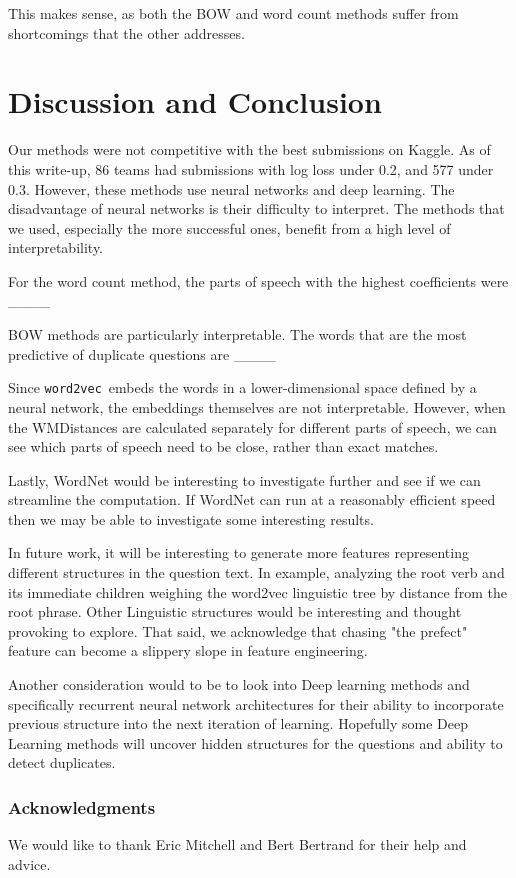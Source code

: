 \documentclass{article} %
\newcommand{\wordtvec}{\texttt{word2vec}}
\begin{document}
This makes sense, as both the BOW and word count methods suffer from shortcomings that the other addresses.

\section{Discussion and Conclusion}

Our methods were not competitive with the best submissions on Kaggle. As of this write-up, 86 teams had submissions with log loss under 0.2, and 577 under 0.3. However, these methods use neural networks and deep learning. The disadvantage of neural networks is their difficulty to interpret. The methods that we used, especially the more successful ones, benefit from a high level of interpretability. 

For the word count method, the parts of speech with the highest coefficients were \_\_\_\_

BOW methods are particularly interpretable. The words that are the most predictive of duplicate questions are \_\_\_\_

Since \wordtvec\ embeds the words in a lower-dimensional space defined by a neural network, the embeddings themselves are not interpretable. However, when the WMDistances are calculated separately for different parts of speech, we can see which parts of speech need to be close, rather than exact matches. 

Lastly, WordNet would be interesting to investigate further and see if we can streamline the computation. If WordNet can run at a reasonably efficient speed then we may be able to investigate some interesting results. 

In future work, it will be interesting to generate more features representing different structures in the question text. In example, analyzing the root verb and its immediate children weighing the word2vec linguistic tree by distance from the root phrase. Other Linguistic structures would be interesting and thought provoking to explore. That said, we acknowledge that chasing "the prefect" feature can become a slippery slope in feature engineering.

Another consideration would to be to look into Deep learning methods and specifically recurrent neural network architectures for their ability to incorporate previous structure into the next iteration of learning. Hopefully some Deep Learning methods will uncover hidden structures for the questions and ability to detect duplicates.

\subsubsection*{Acknowledgments}

We would like to thank Eric Mitchell and Bert Bertrand for their help and advice.

\printbibliography
\end{document}
